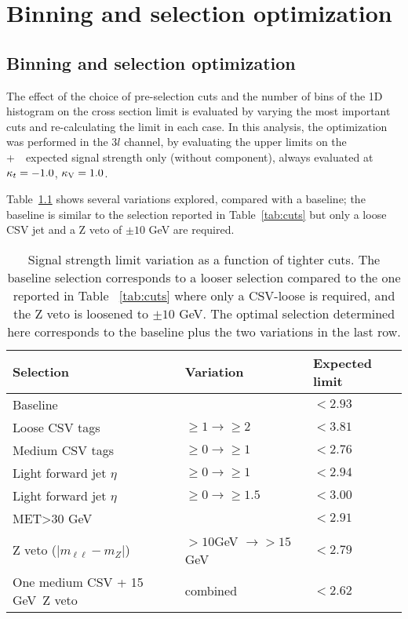\chapter{Binning and selection optimization}\label{app:ad_binning}

\section{Binning and selection optimization}\label{app:binopt}

The effect of the choice of pre-selection cuts and the number of bins of the 1D histogram on the cross section limit is evaluated by varying the most important cuts and re-calculating the limit in each case. In this analysis, the optimization was performed in the $3l$ channel, by evaluating the upper limits on the \tHq+\ \tHW\ expected signal strength only (without \ttH component), always evaluated at $\kappa_t=-1.0$, $\kappa_\text{V}=1.0$.

Table~\ref{cut_limit} shows several variations explored, compared with a baseline; the baseline is similar to the selection reported in Table~\ref{tab:cuts} but only a loose CSV jet and a Z veto of $\pm10$ GeV are required. 

\begin{table}[h!]
\centering
\begin{tabular}{lll}
Selection                         & Variation                & Expected limit \\ \hline
Baseline                          &                          & $<2.93$\\
Loose CSV tags                    & $\geq 1 \to \geq 2$      & $<3.81$\\
Medium CSV tags                   & $\geq 0 \to \geq 1$      & $<2.76$\\
Light forward jet $\eta$          & $\geq 0 \to \geq 1$      & $<2.94$\\
Light forward jet $\eta$          & $\geq 0 \to \geq 1.5$    & $<3.00$\\
MET>30 GeV                        &                          & $<2.91$\\
Z veto ($|m_{\ell\ell}-m_Z|$)     & $>10$GeV $\to >15$ GeV   & $<2.79$\\
One medium CSV + 15 GeV\ Z veto   & combined                 & $<2.62$\\\hline
\end{tabular}
\caption[Selection cuts optimization.]{Signal strength limit variation as a function of tighter cuts. The baseline selection corresponds to a looser selection compared to the one reported in Table ~\ref{tab:cuts} where only a CSV-loose \bjet is required, and the Z veto is loosened to $\pm10$ GeV. The optimal selection determined here corresponds to the baseline plus the two variations in the last row.}
\label{cut_limit}
\end{table}

